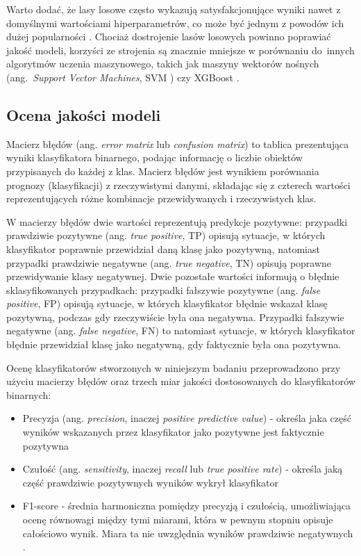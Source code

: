 \documentclass{amuthesis}
\begin{document}
Warto dodać, że lasy losowe często wykazują satysfakcjonujące wyniki
nawet z domyślnymi wartościami hiperparametrów, co może być jednym z
powodów ich dużej popularności \autocite{lovelace_2019_geocomputation}.
Chociaż dostrojenie lasów losowych powinno poprawiać jakość modeli,
korzyści ze strojenia są znacznie mniejsze w porównaniu do~innych
algorytmów uczenia maszynowego, takich jak maszyny wektorów nośnych
(ang.~\emph{Support Vector Machines}, SVM \autocite{svm})
\autocite{probst_2019_hyperparameters} czy XGBoost \autocite{xgboost}.

\hypertarget{sec-model-quality-assessment}{%
\subsection{Ocena jakości modeli}\label{sec-model-quality-assessment}}

Macierz błędów (ang. \emph{error matrix} lub \emph{confusion matrix}) to
tablica prezentująca wyniki klasyfikatora binarnego, podając informację
o liczbie obiektów przypisanych do każdej z klas. Macierz błędów jest
wynikiem porównania prognozy (klasyfikacji) z rzeczywistymi danymi,
składając się z czterech wartości reprezentujących różne kombinacje
przewidywanych i rzeczywistych klas.

W macierzy błędów dwie wartości reprezentują predykcje pozytywne:
przypadki prawdziwie pozytywne (ang. \emph{true positive}, TP) opisują
sytuacje, w których klasyfikator poprawnie przewidział daną klasę jako
pozytywną, natomiast przypadki prawdziwie negatywne (ang. \emph{true
negative}, TN) opisują poprawne przewidywanie klasy negatywnej. Dwie
pozostałe wartości informują o błędnie sklasyfikowanych przypadkach:
przypadki fałszywie pozytywne (ang. \emph{false positive}, FP) opisują
sytuacje, w których klasyfikator błędnie wskazał klasę pozytywną,
podczas gdy rzeczywiście była ona negatywna. Przypadki fałszywie
negatywne (ang. \emph{false negative}, FN) to natomiast sytuacje, w
których klasyfikator błędnie przewidział klasę jako negatywną, gdy
faktycznie była ona pozytywna.

Ocenę klasyfikatorów stworzonych w niniejszym badaniu przeprowadzono
przy użyciu macierzy błędów oraz trzech miar jakości dostosowanych do
klasyfikatorów binarnych:

\begin{itemize}
\item
  Precyzja (ang. \emph{precision}, inaczej \emph{positive predictive
  value}) - określa jaka część wyników wskazanych przez klasyfikator
  jako pozytywne jest faktycznie pozytywna
  \autocite{jaworski_2013_perfomance_measures}
\item
  Czułość (ang. \emph{sensitivity}, inaczej \emph{recall} lub \emph{true
  positive rate}) - określa jaką część prawdziwie pozytywnych wyników
  wykrył klasyfikator \autocite{jaworski_2013_perfomance_measures}
\item
  F1-score - średnia harmoniczna pomiędzy precyzją i czułością,
  umożliwiająca ocenę równowagi między tymi miarami, która w pewnym
  stopniu opisuje całościowo wynik. Miara ta nie uwzględnia wyników
  prawdziwie negatywnych \autocite{zygierewicz_2021_ml}.
\end{itemize}
\end{document}
